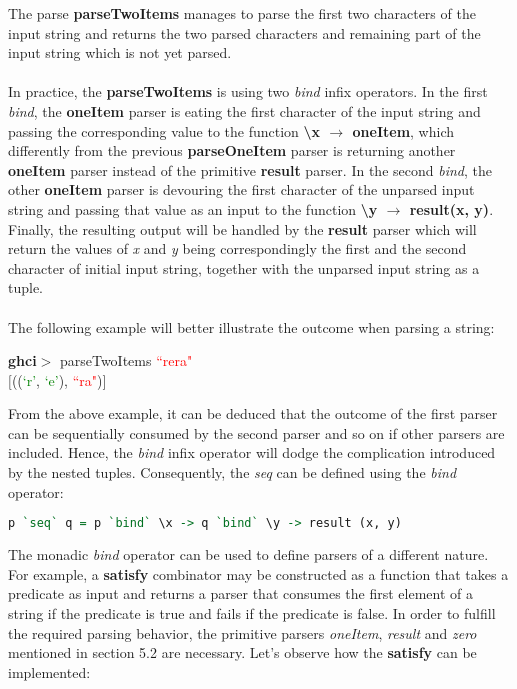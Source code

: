 \documentclass[a4paper, onecolumn]{article}
\begin{document}
    The parse \textbf{parseTwoItems} manages to parse the first two characters of the input string and returns the two parsed characters and remaining part of the input string which is not yet parsed. \\ \\
    In practice, the \textbf{parseTwoItems} is using two \textit{bind} infix operators. In the first \textit{bind}, the \textbf{oneItem} parser is eating the first character of the input string and passing the corresponding value to the function \textbf{\textbackslash x $\rightarrow$ oneItem}, which differently from the previous \textbf{parseOneItem} parser is returning another \textbf{oneItem} parser instead of the primitive \textbf{result} parser. In the second \textit{bind}, the  other \textbf{oneItem} parser is devouring the first character of the unparsed input string and passing that value as an input to the function \textbf{\textbackslash y $\rightarrow$ result(x, y)}. Finally, the resulting output will be handled by the \textbf{result} parser which will return the values of \textit{x} and \textit{y} being correspondingly the first and the second character of initial input string, together with the unparsed input string as a tuple. \\ \\ 
    The following example will better illustrate the outcome when parsing a string:
       \begin{center}
            \textbf{ghci$>$} parseTwoItems \textcolor{red}{``rera"} \\
            $\big[$((\textcolor{green}{`r'}, \textcolor{green}{`e'}), \textcolor{red}{``ra"})$\big]$
        \end{center}
        
    From the above example, it can be deduced that the outcome of the first parser can be sequentially consumed by the second parser and so on if other parsers are included. Hence, the \textit{bind} infix operator will dodge the complication introduced by the nested tuples. Consequently, the \textit{seq} can be defined using the \textit{bind} operator: 
    
    \begin{tcolorbox}
    \begin{lstlisting}[language=Haskell]
      p `seq` q = p `bind` \x -> q `bind` \y -> result (x, y)
    \end{lstlisting}
    \end{tcolorbox}
    
    The monadic \textit{bind} operator can be used to define parsers of a different nature. For example, a \textbf{satisfy} combinator may be constructed as a function that takes a predicate as input and returns a parser that consumes the first element of a string if the predicate is true and fails if the predicate is false. In order to fulfill the required parsing behavior, the primitive parsers \textit{oneItem}, \textit{result} and \textit{zero} mentioned in section 5.2 are necessary. Let's observe how the \textbf{satisfy} can be implemented: 
    
\end{document}

